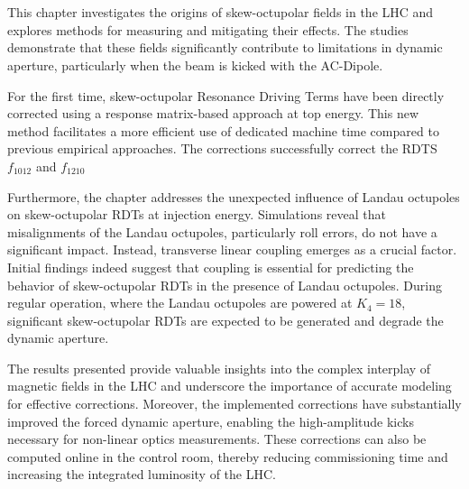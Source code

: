 \FloatBarrier
\section{}

This chapter investigates the origins of skew-octupolar fields in the LHC and explores methods for
measuring and mitigating their effects. The studies demonstrate that these fields significantly
contribute to limitations in dynamic aperture, particularly when the beam is kicked with the
AC-Dipole. 

For the first time, skew-octupolar Resonance Driving Terms have been directly corrected using
a response matrix-based approach at top energy. This new method facilitates a more efficient use of
dedicated machine time compared to previous empirical approaches. The corrections successfully
correct the RDTS $f_{1012}$ and $f_{1210}$

Furthermore, the chapter addresses the unexpected influence of Landau octupoles on skew-octupolar
RDTs at injection energy. Simulations reveal that misalignments of the Landau octupoles,
particularly roll errors, do not have a significant impact. Instead, transverse linear coupling
emerges as a crucial factor.
Initial findings indeed suggest that coupling is essential for predicting the behavior of
skew-octupolar RDTs in the presence of Landau octupoles. During regular operation, where the Landau
octupoles are powered at $K_4 = 18$, significant skew-octupolar RDTs are expected to be generated
and degrade the dynamic aperture.

The results presented provide valuable insights into the complex interplay of magnetic fields in the
LHC and underscore the importance of accurate modeling for effective corrections. Moreover, the
implemented corrections have substantially improved the forced dynamic aperture, enabling the
high-amplitude kicks necessary for non-linear optics measurements. These corrections can also be
computed online in the control room, thereby reducing commissioning time and increasing the
integrated luminosity of the LHC.
